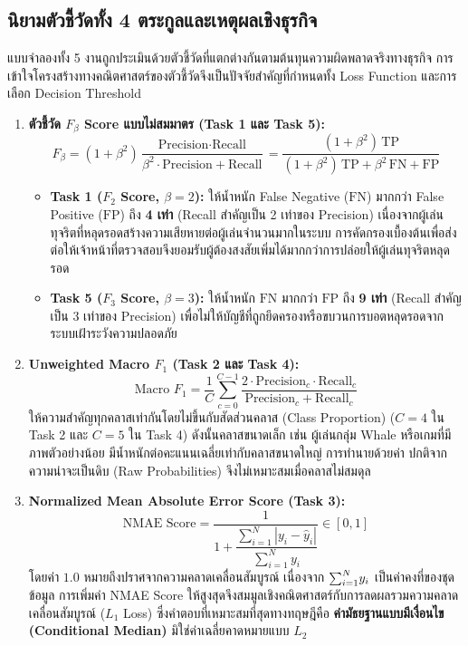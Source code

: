 \documentclass[11pt,a4paper]{article}
\DeclareRobustCommand{\code}[1]{\leavevmode{\ttfamily\color{KeyGreen!85!black}\let\codeunderscore\_\def\_{\codeunderscore\allowbreak}\hyphenpenalty=50\exhyphenpenalty=50\relax#1}}
\begin{document}
\subsection{นิยามตัวชี้วัดทั้ง 4 ตระกูลและเหตุผลเชิงธุรกิจ}

แบบจำลองทั้ง 5 งานถูกประเมินด้วยตัวชี้วัดที่แตกต่างกันตามต้นทุนความผิดพลาดจริงทางธุรกิจ การเข้าใจโครงสร้างทางคณิตศาสตร์ของตัวชี้วัดจึงเป็นปัจจัยสำคัญที่กำหนดทั้ง Loss Function และการเลือก Decision Threshold

\begin{enumerate}
    \item \textbf{ตัวชี้วัด $F_\beta$ Score แบบไม่สมมาตร (Task 1 และ Task 5):}
    \[
    F_\beta = (1 + \beta^2)\frac{\text{Precision} \cdot \text{Recall}}{\beta^2 \cdot \text{Precision} + \text{Recall}} = \frac{(1 + \beta^2)\,\text{TP}}{(1 + \beta^2)\,\text{TP} + \beta^2\,\text{FN} + \text{FP}}
    \]
    \begin{itemize}
        \item \textbf{Task 1 ($F_2$ Score, $\beta=2$):} ให้น้ำหนัก False Negative ($\text{FN}$) มากกว่า False Positive ($\text{FP}$) ถึง \textbf{4 เท่า} (Recall สำคัญเป็น 2 เท่าของ Precision) เนื่องจากผู้เล่นทุจริตที่หลุดรอดสร้างความเสียหายต่อผู้เล่นจำนวนมากในระบบ การคัดกรองเบื้องต้นเพื่อส่งต่อให้เจ้าหน้าที่ตรวจสอบจึงยอมรับผู้ต้องสงสัยเพิ่มได้มากกว่าการปล่อยให้ผู้เล่นทุจริตหลุดรอด
        \item \textbf{Task 5 ($F_3$ Score, $\beta=3$):} ให้น้ำหนัก $\text{FN}$ มากกว่า $\text{FP}$ ถึง \textbf{9 เท่า} (Recall สำคัญเป็น 3 เท่าของ Precision) เพื่อไม่ให้บัญชีที่ถูกยึดครองหรือขบวนการบอตหลุดรอดจากระบบเฝ้าระวังความปลอดภัย
    \end{itemize}

    \item \textbf{Unweighted Macro $F_1$ (Task 2 และ Task 4):}
    \[
    \text{Macro } F_1 = \frac{1}{C}\sum_{c=0}^{C-1} \frac{2 \cdot \text{Precision}_c \cdot \text{Recall}_c}{\text{Precision}_c + \text{Recall}_c}
    \]
    ให้ความสำคัญทุกคลาสเท่ากันโดยไม่ขึ้นกับสัดส่วนคลาส (Class Proportion) ($C=4$ ใน Task 2 และ $C=5$ ใน Task 4) ดังนั้นคลาสขนาดเล็ก เช่น ผู้เล่นกลุ่ม Whale หรือเกมที่มีภาพตัวอย่างน้อย มีน้ำหนักต่อคะแนนเฉลี่ยเท่ากับคลาสขนาดใหญ่ การทำนายด้วยค่า \code{argmax} ปกติจากความน่าจะเป็นดิบ (Raw Probabilities) จึงไม่เหมาะสมเมื่อคลาสไม่สมดุล

    \item \textbf{Normalized Mean Absolute Error Score (Task 3):}
    \[
    \text{NMAE Score} = \frac{1}{1 + \dfrac{\sum_{i=1}^{N} |y_i - \hat{y}_i|}{\sum_{i=1}^{N} y_i}} \in [0, 1]
    \]
    โดยค่า $1.0$ หมายถึงปราศจากความคลาดเคลื่อนสัมบูรณ์ เนื่องจาก $\smash{\sum_{i=1}^N} y_i$ เป็นค่าคงที่ของชุดข้อมูล การเพิ่มค่า NMAE Score ให้สูงสุดจึงสมมูลเชิงคณิตศาสตร์กับการลดผลรวมความคลาดเคลื่อนสัมบูรณ์ ($L_1$ Loss) ซึ่งคำตอบที่เหมาะสมที่สุดทางทฤษฎีคือ \textbf{ค่ามัธยฐานแบบมีเงื่อนไข (Conditional Median)} มิใช่ค่าเฉลี่ยคาดหมายแบบ $L_2$


\end{enumerate}
\end{document}
